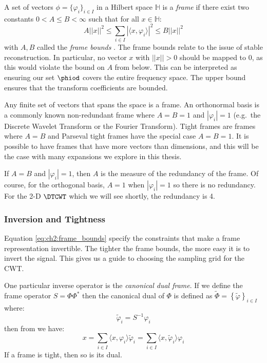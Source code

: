 A set of vectors $ \phi = \{ \varphi_i \}_{i \in I}$ in a Hilbert space
$\mathbb{H}$ is a \emph{frame} if there exist two constants $0 < A\leq B <
\infty$ such that for all $x \in \mathbb{H}$:
\begin{equation}
  A||x||^2 \leq \sum_{i\in I} |\langle x, \varphi_i \rangle|^2 \leq B ||x||^2
  \label{eq:ch2:frame_bounds}
\end{equation}
with $A, B$ called the \emph{frame bounds} \cite{kovacevic_introduction_2008}.
The frame bounds relate to the issue of stable reconstruction. In particular, no
vector $x$ with $||x||>0$ should be mapped to 0, as this would violate the bound
on $A$ from below. This can be interpreted as ensuring our set $\phiod$ covers the
entire frequency space. The upper bound ensures that the transform
coefficients are bounded.

Any finite set of vectors that spans the space is a frame. An orthonormal basis
is a commonly known non-redundant frame where $A=B=1$ and $|\varphi_i|=1$ (e.g.\ the Discrete
Wavelet Transform or the Fourier Transform). Tight frames are frames where $A=B$
and Parseval tight frames have the special case $A=B=1$. It is possible to have
frames that have more vectors than dimensions, and this will be the case with
many expansions we explore in this thesis.

If $A=B$ and $|\varphi_i| = 1$, then $A$ is
the measure of the redundancy of the frame. Of course, for the orthogonal basis,
$A=1$ when $|\varphi_i|=1$ so there is no redundancy. For the 2-D $\DTCWT$ which we
will see shortly, the redundancy is 4.

\subsubsection{Inversion and Tightness}
Equation \eqref{eq:ch2:frame_bounds} specify the constraints that make a frame
representation invertible.
The tighter the frame bounds, the more easy it is to invert the signal.
This gives us a guide to choosing the sampling grid for the CWT.

One particular inverse operator is the \emph{canonical dual frame}.
If we define the frame operator $S = \Phi\Phi^*$ then the canonical dual
of $\Phi$ is defined as $\tilde{\Phi} = \left\{ \tilde{\varphi}\right\}_{i \in I}$
where:
\begin{equation}
  \tilde{\varphi}_i = S^{-1}\varphi_i
\end{equation}
then from \cite{kovacevic_introduction_2008} we have:
\begin{equation}
  x = \sum_{i\in I} \langle x, \varphi_i \rangle \tilde{\varphi}_i = \sum_{i\in I}
  \langle x, \tilde{\varphi}_i \rangle \varphi_i
\end{equation}
If a frame is tight, then so is its dual.

